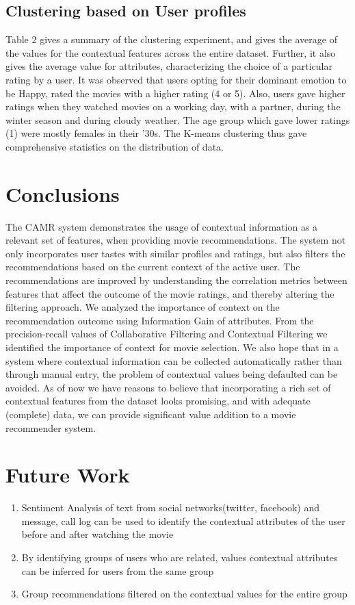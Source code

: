 \documentclass{article}
\begin{document}
\subsection{Clustering based on User profiles}
 Table 2 gives a summary of the clustering experiment, and gives the average of the values for the contextual features across the entire dataset. Further, it also gives the average value for attributes, characterizing the choice of a particular rating by a user. It was observed that users opting for their dominant emotion to be Happy, rated the movies with a higher rating (4 or 5). Also, users gave higher ratings when they watched movies on a working day, with a partner, during the winter season and during cloudy weather. The age group which gave lower ratings (1) were mostly females in their '30s. The K-means clustering thus gave comprehensive statistics on the distribution of data.

\section{Conclusions}
 The CAMR system demonstrates the usage of contextual information as a relevant set of features, when providing movie recommendations. The system not only incorporates user tastes with similar profiles and ratings, but also filters the recommendations based on the current context of the active user. The recommendations are improved by understanding the correlation metrics between features that affect the outcome of the movie ratings, and thereby altering the filtering approach. We analyzed the importance of context on the recommendation outcome using Information Gain of attributes. From the precision-recall values of Collaborative Filtering and Contextual Filtering we identified the importance of context for movie selection. We also hope that in a system where contextual information can be collected automatically rather than through manual entry, the problem of contextual values being defaulted can be avoided. As of now we have reasons to believe that incorporating a rich set of contextual features from the dataset looks promising, and with adequate (complete) data, we can provide significant value addition to a movie recommender system.

\section{Future Work}

\begin{enumerate}
\item Sentiment Analysis of text from social networks(twitter, facebook) and message, call log can be used to identify the contextual attributes of the user before and after watching the movie
\item By identifying groups of users who are related, values contextual attributes can be inferred for users from the same group
\item Group recommendations filtered on the contextual values for the entire group
\end{enumerate}
\\
\\
\\
\\
\end{document}
